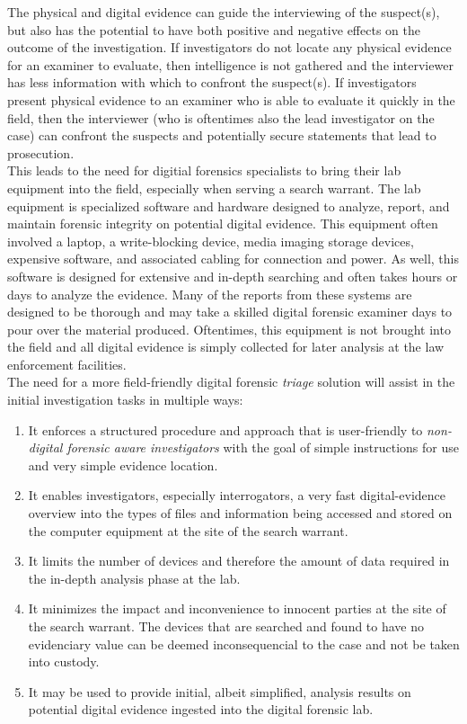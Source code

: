 \documentclass[12pt]{article}
\begin{document}
The physical and digital evidence can guide the interviewing of the suspect(s), but also
has the potential to have both positive and negative effects on the
outcome of the investigation. If investigators do not locate any physical evidence for an examiner
to evaluate, then intelligence is not gathered and the interviewer has less information with which
to confront the suspect(s). If investigators present physical evidence to an examiner who is able to
evaluate it quickly in the field, then the interviewer (who is oftentimes also the lead investigator
on the case) can confront the suspects and potentially secure statements that lead to prosecution.\\

This leads to the need for digitial forensics specialists to bring their lab equipment into the field,
especially when serving a search warrant.  The lab equipment is specialized software and hardware
designed to analyze, report, and maintain forensic integrity on potential digital evidence.  This
equipment often involved a laptop, a write-blocking device, media imaging storage devices, expensive
software, and associated cabling for connection and power.  As well, this software is designed for
extensive and in-depth searching and often takes hours or days to analyze the evidence.  Many of the
reports from these systems are designed to be thorough and may take a skilled digital forensic
examiner days to pour over the material produced.  Oftentimes, this equipment is not brought
into the field and all digital evidence is simply collected for later analysis at the law
enforcement facilities.\\

The need for a more field-friendly digital forensic {\em triage} solution will assist in the initial
investigation tasks in multiple ways:
\begin{enumerate}
  \item It enforces a structured procedure and approach that is user-friendly to {\em non-digital
  forensic aware investigators} with the goal of simple instructions for use and very simple 
  evidence location.
  \item It enables investigators, especially interrogators, a very fast digital-evidence overview
  into the types of files
  and information being accessed and stored on the computer equipment at the site of the search
  warrant.
  \item It limits the number of devices and therefore the amount of data required in the in-depth
  analysis phase at the lab.
  \item It minimizes the impact and inconvenience to innocent parties at the site of the 
  search warrant.  The devices that are searched and found to have no evidenciary value can be
  deemed inconsequencial to the case and not be taken into custody.
  \item It may be used to provide initial, albeit simplified, analysis results on potential
  digital evidence ingested into the digital forensic lab.
\end{enumerate}
\end{document}
